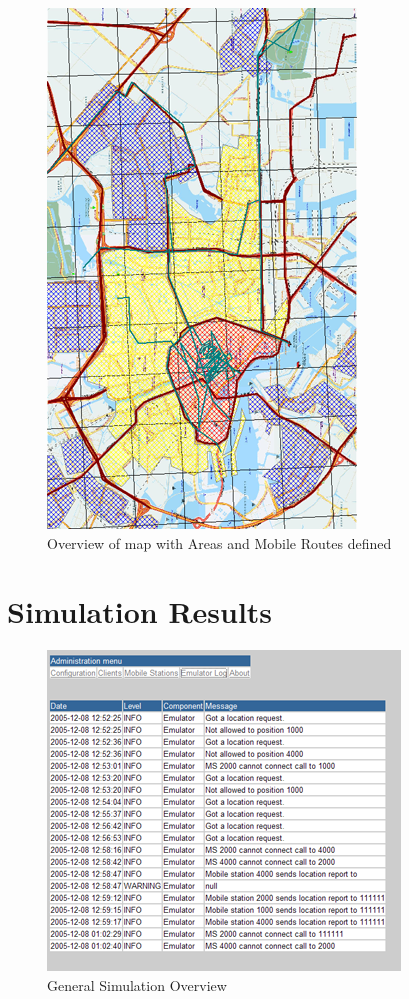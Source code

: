 \documentclass[a4paper,12pt]{article}
\begin{document}
\begin{figure}[h]

\includegraphics{routes.png}

\caption{Overview of map with Areas and Mobile Routes defined}

\end{figure}

\section{Simulation Results}

\begin{figure}[h]

\includegraphics{screen7.png}

\caption{General Simulation Overview}

\end{figure}
\end{document}
